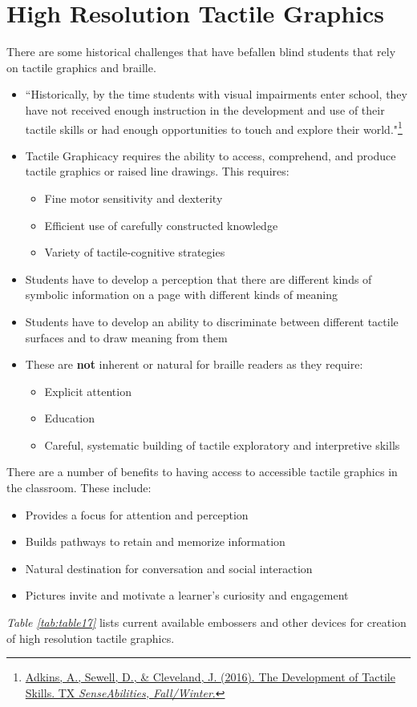 \pagebreak
\hypertarget{tactile-graphics-high-resolution-complex-graphics}{}\section{High Resolution Tactile Graphics}\label{tactile-graphics-high-resolution-complex-graphics}
There are some historical challenges that have befallen blind students that rely on tactile graphics and braille.
\begin{itemize}[leftmargin=*]
 \item ``Historically, by the time students with visual impairments enter school, they have not received enough instruction in the development and use of their tactile skills or had enough opportunities to touch and explore their world."\footnote{\raggedright \href{http://www.tsbvi.edu/tx-senseabilities/issues/fall-winter-2016/the-development-of-tactile-skills}{Adkins, A., Sewell, D., \& Cleveland, J. (2016). The Development of Tactile Skills. TX \textit{SenseAbilities, Fall/Winter}.}}
 \item Tactile Graphicacy requires the ability to access, comprehend, and produce tactile graphics or raised line drawings. This requires:\begin{itemize}
 \item Fine motor sensitivity and dexterity
 \item Efficient use of carefully constructed knowledge
 \item Variety of tactile-cognitive strategies
\end{itemize}
\item Students have to develop a perception that there are different kinds of symbolic information on a page with different kinds of meaning
\item Students have to develop an ability to discriminate between different tactile surfaces and to draw meaning from them
\item These are \textbf{not} inherent or natural for braille readers as they require:
\begin{itemize}
 \item Explicit attention
 \item Education
 \item Careful, systematic building of tactile exploratory and interpretive skills
\end{itemize}

\end{itemize}

There are a number of benefits to having access to accessible tactile graphics in the classroom. These include:
\begin{itemize}[leftmargin=*]
 \item Provides a focus for attention and perception
 \item Builds pathways to retain and memorize information
 \item Natural destination for conversation and social interaction
 \item Pictures invite and motivate a learner's curiosity and engagement
\end{itemize}
\textit{Table \ref{tab:table17}} lists current available embossers and other devices for creation of high resolution tactile graphics.

